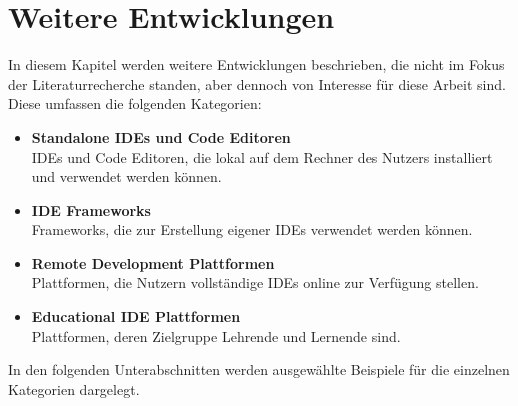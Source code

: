 \section{Weitere Entwicklungen}\label{section:stand-der-technik:weitere-entwicklungen}

In diesem Kapitel werden weitere Entwicklungen beschrieben, die nicht im Fokus der Literaturrecherche standen, aber dennoch von Interesse für diese Arbeit sind. Diese umfassen die folgenden Kategorien:

\begin{itemize}
    \item \textbf{Standalone IDEs und Code Editoren} \\
          IDEs und Code Editoren, die lokal auf dem Rechner des Nutzers installiert und verwendet werden können.
    \item \textbf{IDE Frameworks} \\
          Frameworks, die zur Erstellung eigener IDEs verwendet werden können.
    \item \textbf{Remote Development Plattformen} \\
          Plattformen, die Nutzern vollständige IDEs online zur Verfügung stellen.
    \item \textbf{Educational IDE Plattformen} \\
          Plattformen, deren Zielgruppe Lehrende und Lernende sind.
\end{itemize}

In den folgenden Unterabschnitten werden ausgewählte Beispiele für die einzelnen Kategorien dargelegt.




